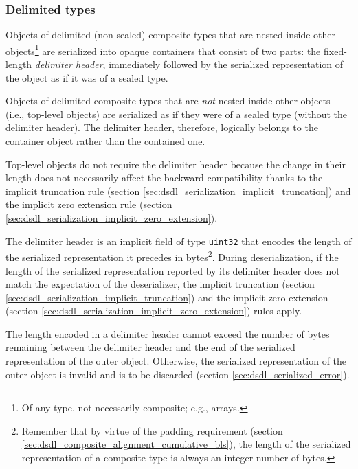 \subsubsection{Delimited types}\label{sec:dsdl_serialization_composite_non_sealed}

Objects of delimited (non-sealed) composite types that are nested inside other objects\footnote{%
    Of any type, not necessarily composite; e.g., arrays.
}
are serialized into opaque containers that consist of two parts:
the fixed-length \emph{delimiter header},
immediately followed by the serialized representation of the object as if it was of a sealed type.

Objects of delimited composite types that are \emph{not} nested inside other objects (i.e., top-level objects)
are serialized as if they were of a sealed type (without the delimiter header).
The delimiter header, therefore, logically belongs to the container object rather than the contained one.

\begin{remark}
    Top-level objects do not require the delimiter header because the change in their length does not necessarily
    affect the backward compatibility thanks to the implicit truncation rule
    (section \ref{sec:dsdl_serialization_implicit_truncation}) and the implicit zero extension rule
    (section \ref{sec:dsdl_serialization_implicit_zero_extension}).
\end{remark}

The delimiter header is an implicit field of type \verb|uint32| that encodes the length of the
serialized representation it precedes in bytes\footnote{%
    Remember that by virtue of the padding requirement (section \ref{sec:dsdl_composite_alignment_cumulative_bls}),
    the length of the serialized representation of a composite type is always an integer number of bytes.
}.
During deserialization, if the length of the serialized representation reported by its delimiter header
does not match the expectation of the deserializer,
the implicit truncation (section \ref{sec:dsdl_serialization_implicit_truncation})
and the implicit zero extension (section \ref{sec:dsdl_serialization_implicit_zero_extension})
rules apply.

The length encoded in a delimiter header cannot exceed the number of bytes remaining between the delimiter header
and the end of the serialized representation of the outer object.
Otherwise, the serialized representation of the outer object is invalid and is to be discarded
(section \ref{sec:dsdl_serialized_error}).

